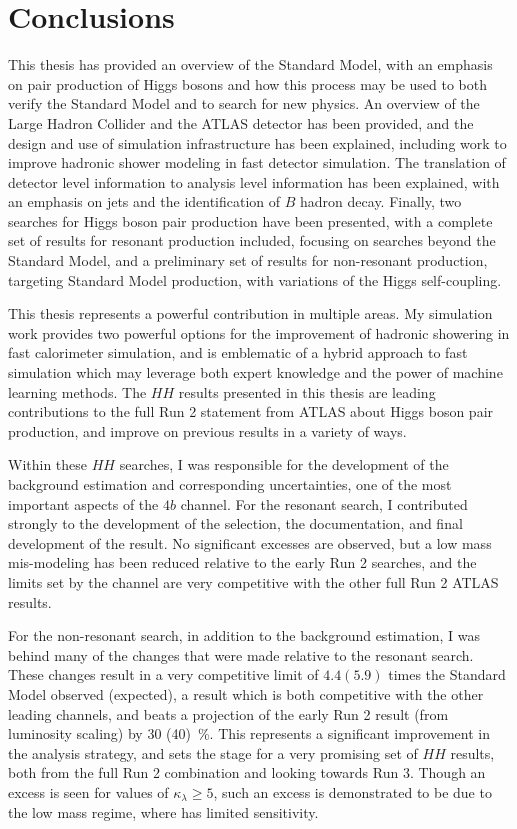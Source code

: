 \chapter{Conclusions}
\label{chap:conclusions}

This thesis has provided an overview of the Standard Model, with an emphasis on pair production of Higgs bosons and how this process may be used to both verify the Standard Model and to search for new physics. An overview of the Large Hadron 
Collider and the ATLAS detector has been provided, and the design and use of simulation infrastructure has been explained, 
including work to improve hadronic shower modeling in fast detector simulation. The translation of detector level 
information to analysis level information has been explained, with an emphasis on jets and the identification of $B$ hadron 
decay. Finally, two searches for Higgs boson pair production have been presented, with a complete set of results for 
resonant production included, focusing on searches beyond the Standard Model, and a preliminary set of results for 
non-resonant production, targeting Standard Model production, with variations of the Higgs self-coupling.

This thesis represents a powerful contribution in multiple areas. My simulation work provides two powerful options for the 
improvement of hadronic showering in fast calorimeter simulation, and is emblematic of a hybrid approach to fast simulation 
which may leverage both expert knowledge and the power of machine learning methods. The $HH$ results presented in this 
thesis are leading contributions to the full Run 2 statement from ATLAS about Higgs boson pair production, and improve on 
previous results in a variety of ways. 

Within these $HH$ searches, I was responsible for the development of the background 
estimation and corresponding uncertainties, one of the most important aspects of the $4b$ channel. For the resonant 
search, I contributed strongly to the development of the selection, the documentation, and final development of the 
result. No significant excesses are observed, but a low mass mis-modeling has been reduced relative to the early 
Run 2 searches, and the limits set by the \bbbb channel are very competitive with the other full Run 2 ATLAS results.

For the non-resonant search, in addition to the background estimation, I was behind many of the changes that were made 
relative to the resonant search. These changes result in a very competitive limit of $4.4(5.9)$ times the Standard Model 
observed (expected), a result which is both competitive with the other leading channels, and beats a projection of 
the early Run 2 result (from luminosity scaling) by 30 (40)~\%. This represents a significant improvement in the analysis 
strategy, and sets the stage for a very promising set of $HH$ results, both from the full Run 2 combination and looking 
towards Run 3. Though an excess is seen for values of $\kappa_{\lambda} \geq 5$, such an excess is demonstrated to be due 
to the low mass regime, where \bbbb has limited sensitivity.


